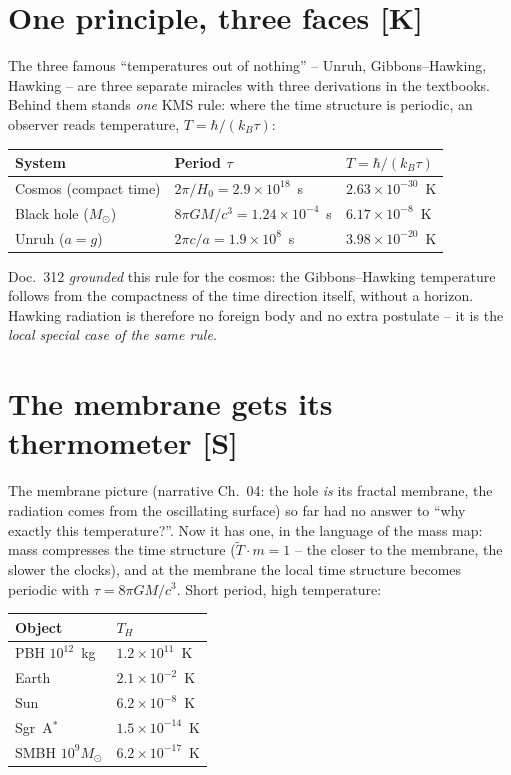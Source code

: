 \documentclass[11pt]{report}
\begin{document}
\section{One principle, three faces [K]}

The three famous \enquote{temperatures out of nothing} -- Unruh,
Gibbons--Hawking, Hawking -- are three separate miracles with
three derivations in the textbooks. Behind them stands \emph{one}
KMS rule: where the time structure is periodic, an observer reads
temperature, $T = \hbar/(k_B\tau)$:

\begin{center}
\begin{tabular}{lll}
\toprule
System & Period $\tau$ & $T = \hbar/(k_B\tau)$ \\
\midrule
Cosmos (compact time) & $2\pi/H_0 = 2.9\times10^{18}$~s &
  $2.63\times10^{-30}$~K \\
Black hole ($M_\odot$) & $8\pi GM/c^3 = 1.24\times10^{-4}$~s &
  $6.17\times10^{-8}$~K \\
Unruh ($a = g$) & $2\pi c/a = 1.9\times10^{8}$~s &
  $3.98\times10^{-20}$~K \\
\bottomrule
\end{tabular}
\end{center}

Doc.~312 \emph{grounded} this rule for the cosmos: the
Gibbons--Hawking temperature follows from the compactness of the
time direction itself, without a horizon. Hawking radiation is
therefore no foreign body and no extra postulate -- it is the
\emph{local special case of the same rule}.

\section{The membrane gets its thermometer [S]}

The membrane picture (narrative Ch.~04: the hole \emph{is} its
fractal membrane, the radiation comes from the oscillating
surface) so far had no answer to \enquote{why exactly this
temperature?}. Now it has one, in the language of the mass map:
mass compresses the time structure ($\tilde T \cdot m = 1$ -- the
closer to the membrane, the slower the clocks), and at the
membrane the local time structure becomes periodic with
$\tau = 8\pi GM/c^3$. Short period, high temperature:

\begin{center}
\begin{tabular}{ll}
\toprule
Object & $T_H$ \\
\midrule
PBH $10^{12}$~kg & $1.2\times10^{11}$~K \\
Earth & $2.1\times10^{-2}$~K \\
Sun & $6.2\times10^{-8}$~K \\
Sgr~A$^{*}$ & $1.5\times10^{-14}$~K \\
SMBH $10^{9}M_\odot$ & $6.2\times10^{-17}$~K \\
\bottomrule
\end{tabular}
\end{center}
\end{document}
